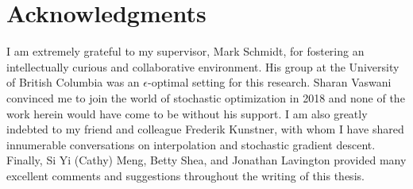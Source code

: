 
\chapter{Acknowledgments}

I am extremely grateful to my supervisor, Mark Schmidt, for fostering an intellectually curious and collaborative environment.
His group at the University of British Columbia was an \( \epsilon \)-optimal setting for this research.
Sharan Vaswani convinced me to join the world of stochastic optimization in 2018 and none of the work herein would have come to be without his support.
I am also greatly indebted to my friend and colleague Frederik Kunstner, with whom I have shared innumerable conversations on interpolation and stochastic gradient descent. 
Finally, Si Yi (Cathy) Meng, Betty Shea, and Jonathan Lavington provided many excellent comments and suggestions throughout the writing of this thesis. 

